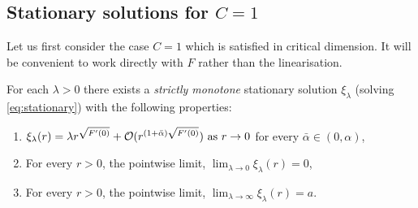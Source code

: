 \documentclass{amsart}
\begin{document}
\subsection{Stationary solutions for \(C=1\)}

Let us first consider the case \(C = 1\) which is satisfied in critical dimension. It will be convenient to work directly with \(F\) rather than the linearisation.

\begin{lemma}
\label{lem:stationaryC1}
For each \(\lambda > 0 \) there exists a \emph{strictly monotone} stationary solution \(\xi_{\lambda}\) (solving \eqref{eq:stationary}) with the following properties:
\begin{enumerate}
\item \(\xi_{\lambda} (r) = \lambda r^{\sqrt{F'(0)}} + \operatorname{\mathcal{O}}(r^{(1+\bar{\alpha}) \sqrt{F'(0)}}) \text{ as } r \to 0\) for every \(\bar{\alpha} \in (0, \alpha)\), \label{itm:stationaryC1_asymptotic}
\item For every \(r > 0\), the pointwise limit, \(\lim_{\lambda \to 0} \xi_{\lambda} (r) = 0\), \label{itm:stationaryC1_lambda_0}
\item For every \(r > 0\), the pointwise limit, \(\lim_{\lambda \to \infty} \xi_{\lambda} (r) =  a \). \label{itm:stationaryC1_lambda_infty}
\end{enumerate}
\end{lemma}
\end{document}

